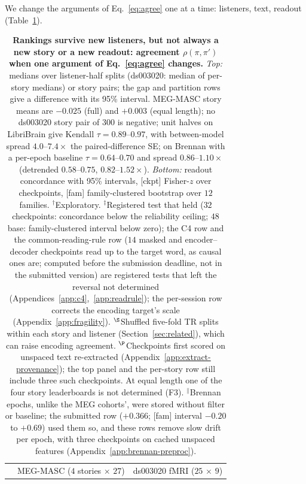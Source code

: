 \documentclass{article}
\begin{document}
We change the arguments of Eq.~\eqref{eq:agree} one at a time: listeners, text, readout
(Table~\ref{tab:main}).

\begin{table}[t]
\centering\footnotesize
\setlength{\tabcolsep}{3.4pt}
\caption{\textbf{Rankings survive new listeners, but not always a new story or a new readout:
agreement $\rho(\pi,\pi')$ when one argument of Eq.~\eqref{eq:agree} changes.} \emph{Top:} medians over listener-half splits (ds003020: median of per-story medians) or story
pairs; the gap and partition rows
give a difference with its 95\% interval. MEG-MASC story means are $-0.025$ (full) and $+0.003$
(equal length); no ds003020 story pair of $300$ is negative; unit halves on LibriBrain
give Kendall $\tau=0.89$--$0.97$, with between-model spread $4.0$--$7.4\times$ the
paired-difference SE; on Brennan with a per-epoch baseline $\tau=0.64$--$0.70$ and spread
$0.86$--$1.10\times$ (detrended $0.58$--$0.75$, $0.82$--$1.52\times$). \emph{Bottom:} readout concordance with 95\% intervals,
[ckpt] Fisher-$z$ over checkpoints, [fam] family-clustered bootstrap over $12$ families.
$^\dagger$Exploratory. $^\ddagger$Registered test that held ($32$ checkpoints: concordance below the
reliability ceiling; $48$ base: family-clustered interval below zero); the C4 row and the
common-reading-rule row ($14$ masked and encoder--decoder checkpoints read up to the target word, as
causal ones are; computed before the submission deadline, not in the submitted version) are registered
tests that left the reversal not determined (Appendices~\ref{app:c4},~\ref{app:readrule}); the
per-session row corrects the encoding target's scale (Appendix~\ref{app:fragility}). $^\S$Shuffled five-fold TR
splits within each story and listener (Section~\ref{sec:related}), which can raise encoding agreement. $^\P$Checkpoints first scored on unspaced text re-extracted
(Appendix~\ref{app:extract-provenance}); the top panel and the per-story row still include three such checkpoints. At
equal length one of the four story leaderboards is not determined (F3). $^\|$Brennan epochs, unlike the
MEG cohorts', were stored without filter or baseline; the submitted row ($+0.366$; [fam] interval $-0.20$ to $+0.69$)
used them so, and these rows remove slow drift per epoch, with three checkpoints on cached unspaced
features (Appendix~\ref{app:brennan-preproc}).}
\label{tab:main}
\begin{tabular}{@{}lrrrr@{}}
\toprule
 & \multicolumn{2}{c}{MEG-MASC ($4$ stories $\times$ $27$)} & \multicolumn{2}{c}{ds003020 fMRI ($25$ $\times$ $9$)} \\

\end{tabular}
\end{table}
\end{document}
